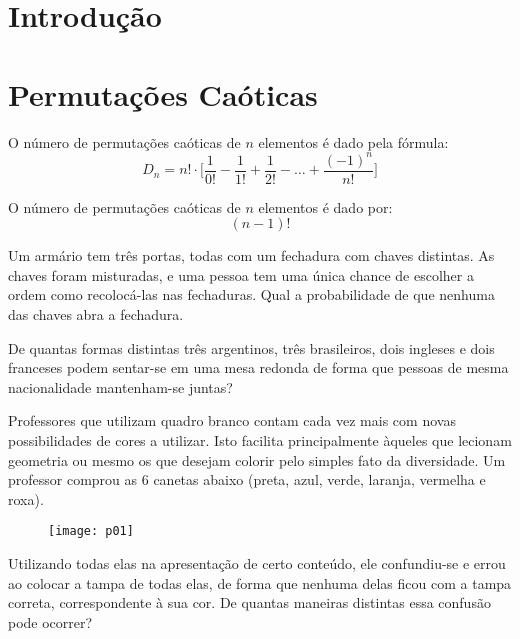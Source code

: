 \documentclass[twocolumn,oneside,a4paper,12pt]{article}
\begin{document}
\maketitle

\section{Introdução}

\section{Permutações Caóticas}
O número de permutações caóticas de \(n\) elementos é dado pela fórmula:
\[D_n = n! \cdot \Bigg[\frac{1}{0!} - \frac{1}{1!} + \frac{1}{2!} - \ldots + \frac{(-1)^n}{n!}\Bigg] \]

O número de permutações caóticas de \(n\) elementos é dado por:
\[(n-1)!\]

\begin{exemplo}
Um armário tem três portas, todas com um fechadura com chaves distintas. As chaves foram misturadas, e uma pessoa tem uma única chance de escolher a ordem como recolocá-las nas fechaduras. Qual a probabilidade de que nenhuma das chaves abra a fechadura.
\end{exemplo}

\begin{exemplo}
De quantas formas distintas três argentinos, três brasileiros, dois ingleses e dois franceses podem sentar-se em uma mesa redonda de forma que pessoas de mesma nacionalidade mantenham-se juntas?
\end{exemplo}

\begin{exemplo}
Professores que utilizam quadro branco contam cada vez mais com novas possibilidades de cores a utilizar. Isto facilita principalmente àqueles que lecionam geometria ou mesmo os que desejam colorir pelo simples fato da diversidade. Um professor comprou as 6 canetas abaixo (preta, azul, verde, laranja, vermelha e roxa).

	\begin{figure}[!tbh]
	\center
	\texttt{[image: p01]}
	\end{figure}

\noindent Utilizando todas elas na apresentação de certo conteúdo, ele confundiu-se e errou ao colocar a tampa de todas elas, de forma que nenhuma delas ficou com a tampa correta, correspondente à sua cor. De quantas maneiras distintas essa confusão pode ocorrer?
\end{exemplo}
\end{document}
